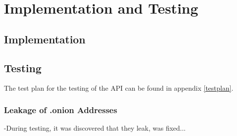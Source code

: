 \section{Implementation and Testing}
	\subsection{Implementation}
	\subsection{Testing}
		The test plan for the testing of the API can be found in appendix \ref{testplan}.
		\subsubsection*{Leakage of .onion Addresses}
			-During testing, it was discovered that they leak, was fixed...